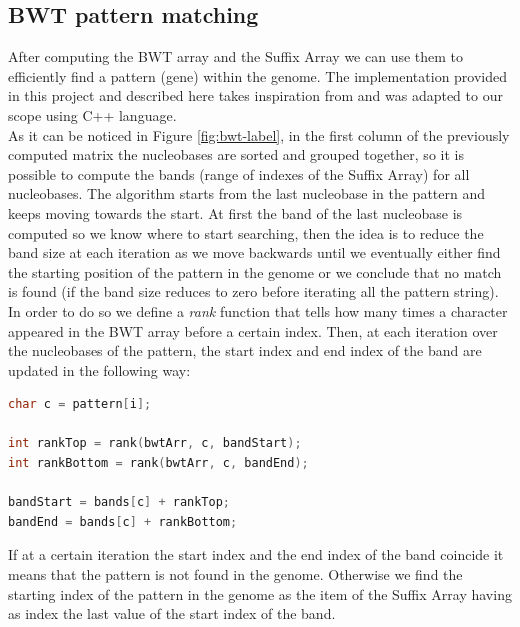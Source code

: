 \documentclass[final,5p,times,twocolumn,authoryear]{elsarticle}
\begin{document}
\subsection{BWT pattern matching}
After computing the BWT array and the Suffix Array we can use them to efficiently find a pattern (gene) within the genome. The implementation provided in this project\cite{bwt.h me} and described here takes inspiration from \cite{mreasy} and was adapted to our scope using C++ language.\\
As it can be noticed in Figure \ref{fig:bwt-label}, in the first column of the previously computed matrix the nucleobases are sorted and grouped together, so it is possible to compute the bands (range of indexes of the Suffix Array) for all nucleobases. The algorithm starts from the last nucleobase in the pattern and keeps moving towards the start. At first the band of the last nucleobase is computed so we know where to start searching, then the idea is to reduce the band size at each iteration as we move backwards until we eventually either find the starting position of the pattern in the genome or we conclude that no match is found (if the band size reduces to zero before iterating all the pattern string). In order to do so we define a \emph{rank} function that tells how many times a character appeared in the BWT array before a certain index. Then, at each iteration over the nucleobases of the pattern, the start index and end index of the band are updated in the following way:
\begin{lstlisting}[language=c++]
char c = pattern[i];

int rankTop = rank(bwtArr, c, bandStart);
int rankBottom = rank(bwtArr, c, bandEnd);

bandStart = bands[c] + rankTop;
bandEnd = bands[c] + rankBottom;
\end{lstlisting}
If at a certain iteration the start index and the end index of the band coincide it means that the pattern is not found in the genome. Otherwise we find the starting index of the pattern in the genome as the item of the Suffix Array having as index the last value of the start index of the band. 
\end{document}

